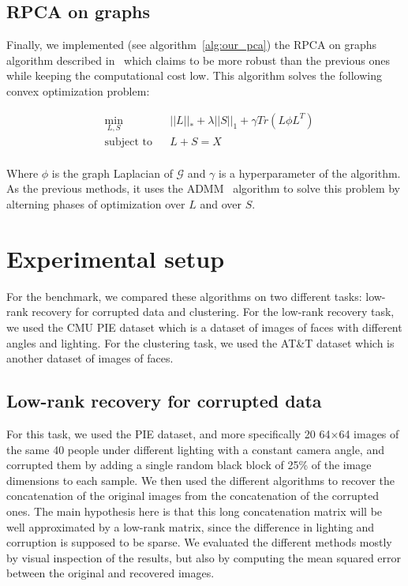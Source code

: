 \documentclass[sigconf]{acmart}
\begin{document}
\subsection{RPCA on graphs}

Finally, we implemented (see algorithm~\ref{alg:our_pca}) the RPCA on graphs algorithm described in~\cite{main_paper} which claims to be more robust than the previous ones while keeping the computational cost low. This algorithm solves the following convex optimization problem:
  
  \begin{equation*}
    \begin{aligned}
    & \underset{L, S}{\min}
    & & ||L||_* + \lambda ||S||_1 + \gamma Tr(L \phi L^T) \\
    & \text{subject to}
    & & L + S = X\\
    \end{aligned}
  \end{equation*}

  Where $\phi$ is the graph Laplacian of $\mathcal{G}$ and $\gamma$ is a hyperparameter of the algorithm. As the previous methods, it uses the ADMM~\cite{admm_paper} algorithm to solve this problem by alterning phases of optimization over $L$ and over $S$.


\section{Experimental setup}

For the benchmark, we compared these algorithms on two different tasks: low-rank recovery for corrupted data and clustering. For the low-rank recovery task, we used the CMU PIE dataset which is a dataset of images of faces with different angles and lighting. For the clustering task, we used the AT\&T dataset which is another dataset of images of faces.

\subsection{Low-rank recovery for corrupted data}

For this task, we used the PIE dataset, and more specifically 20 64$\times$64 images of the same 40 people under different lighting with a constant camera angle, and corrupted them by adding a single random black block of 25\% of the image dimensions to each sample. We then used the different algorithms to recover the concatenation of the original images from the concatenation of the corrupted ones. The main hypothesis here is that this long concatenation matrix will be well approximated by a low-rank matrix, since the difference in lighting and corruption is supposed to be sparse. We evaluated the different methods mostly by visual inspection of the results, but also by computing the mean squared error between the original and recovered images.
\end{document}
